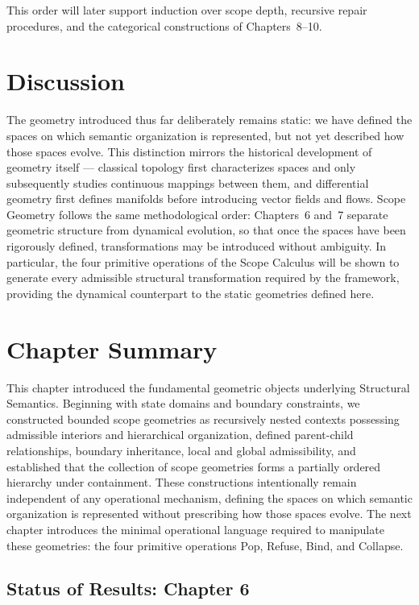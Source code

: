 \documentclass[11pt,twoside,openright]{book}
\numberwithin{equation}{chapter}
\theoremstyle{definition}
\theoremstyle{plain}
\theoremstyle{remark}
\theoremstyle{definition}
\begin{document}
This order will later support induction over scope depth, recursive
repair procedures, and the categorical constructions of Chapters~8--10.

\section{Discussion}

The geometry introduced thus far deliberately remains static: we have
defined the spaces on which semantic organization is represented, but not
yet described how those spaces evolve. This distinction mirrors the
historical development of geometry itself --- classical topology first
characterizes spaces and only subsequently studies continuous mappings
between them, and differential geometry first defines manifolds before
introducing vector fields and flows. Scope Geometry follows the same
methodological order: Chapters~6 and~7 separate geometric structure from
dynamical evolution, so that once the spaces have been rigorously defined,
transformations may be introduced without ambiguity. In particular, the
four primitive operations of the Scope Calculus will be shown to generate
every admissible structural transformation required by the framework,
providing the dynamical counterpart to the static geometries defined here.

\section{Chapter Summary}

This chapter introduced the fundamental geometric objects underlying
Structural Semantics. Beginning with state domains and boundary
constraints, we constructed bounded scope geometries as recursively
nested contexts possessing admissible interiors and hierarchical
organization, defined parent-child relationships, boundary inheritance,
local and global admissibility, and established that the collection of
scope geometries forms a partially ordered hierarchy under containment.
These constructions intentionally remain independent of any operational
mechanism, defining the spaces on which semantic organization is
represented without prescribing how those spaces evolve. The next chapter
introduces the minimal operational language required to manipulate these
geometries: the four primitive operations Pop, Refuse, Bind, and Collapse.

\subsection*{Status of Results: Chapter 6}
\end{document}
